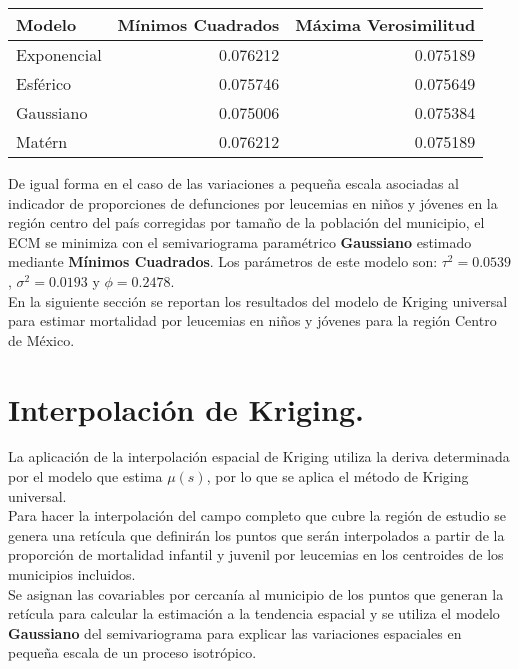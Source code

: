 \documentclass[11pt, oneside]{book}
\begin{document}
\begingroup
    \fontsize{10pt}{12pt}\selectfont
\begin{table}[ht]
\centering
\begin{tabular}{lrr}
  \hline
Modelo & Mínimos Cuadrados & Máxima Verosimilitud \\ 
  \hline
  Exponencial & 0.076212 & 0.075189 \\
  Esférico    & 0.075746 & 0.075649 \\
  Gaussiano   & 0.075006 & 0.075384 \\
  Matérn      & 0.076212 & 0.075189 \\
   \hline
\end{tabular}
\label{tab.ecm.yp}
\end{table}
\endgroup

De igual forma en el caso de las variaciones a pequeña escala asociadas al indicador de proporciones de defunciones por leucemias en niños y jóvenes en la región centro del país corregidas por tamaño de la población del municipio, el ECM se minimiza con el semivariograma paramétrico \textbf{Gaussiano} estimado mediante \textbf{Mínimos Cuadrados}. Los parámetros de este modelo son: $\tau^2 = 0\textrm{.}0539$, $\sigma^2 = 0\textrm{.}0193$ y $\phi = 0\textrm{.}2478$.\\ 

En la siguiente sección se reportan los resultados del modelo de Kriging universal para estimar mortalidad por leucemias en niños y jóvenes para la región Centro de México.

\bigskip

\section{Interpolación de Kriging.}
La aplicación de la interpolación espacial de Kriging utiliza la deriva determinada por el modelo que estima $\mu(s)$, por lo que se aplica el método de Kriging universal.\\ 

Para hacer la interpolación del campo completo que cubre la región de estudio se genera una retícula que definirán los puntos que serán interpolados a partir de la proporción de mortalidad infantil y juvenil por leucemias en los centroides de los municipios incluidos.\\

Se asignan las covariables por cercanía al municipio de los puntos que generan la retícula para calcular la estimación a la tendencia espacial y se utiliza el modelo \textbf{Gaussiano} del semivariograma para explicar las variaciones espaciales en pequeña escala de un proceso isotrópico.\\
\end{document}
